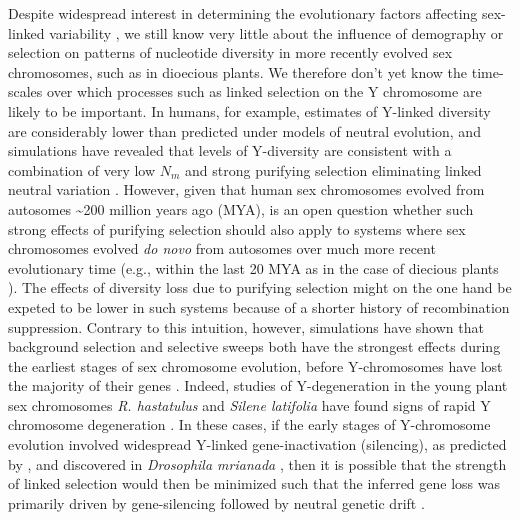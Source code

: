 \documentclass[9pt,twocolumn,twoside]{gsajnl}
\begin{document}
Despite widespread interest in determining the evolutionary factors affecting sex-linked variability \citep{ellegren2011,bachtrog2013NRG}, we still know very little about the influence of demography or selection on patterns of nucleotide diversity in more recently evolved sex chromosomes, such as in dioecious plants. We therefore don't yet know the time-scales over which processes such as linked selection on the Y chromosome are likely to be important. In humans, for example, estimates of Y-linked diversity are considerably lower than predicted under models of neutral evolution, and simulations have revealed that levels of Y-diversity are consistent with a combination of very low $N_{m}$ and strong purifying selection eliminating linked neutral variation \citep{Wilsonsayres2014}. However, given that human sex chromosomes evolved from autosomes \textasciitilde 200 million years ago (MYA), is an open question whether such strong effects of purifying selection should also apply to systems where sex chromosomes evolved \textit{do novo} from autosomes over much more recent evolutionary time (e.g., within the last 20 MYA as in the case of diecious plants \citep{charlesworth2015plant}). The effects of diversity loss due to purifying selection might on the one hand be expeted to be lower in such systems because of a shorter history of recombination suppression. Contrary to this intuition, however, simulations have shown that background selection and selective sweeps both have the strongest effects during the earliest stages of sex chromosome evolution, before Y-chromosomes have lost the majority of their genes \citep{bachtrog2008temporal}. Indeed, studies of Y-degeneration in the young plant sex chromosomes \textit{R. hastatulus} and \textit{Silene latifolia} have found signs of rapid Y chromosome degeneration \citep{hough2014,papadopulos2015,charlesworth2016plant}. In these cases, if the early stages of Y-chromosome evolution involved widespread Y-linked gene-inactivation (silencing), as predicted by \citep{orr1998adaptive}, and discovered in \textit{Drosophila mrianada} \citep{zhou2012chromosome}, then it is possible that the strength of linked selection would then be minimized such that the inferred gene loss was primarily driven by gene-silencing followed by neutral genetic drift \citep{bachtrog2013NRG}.

\end{document}
